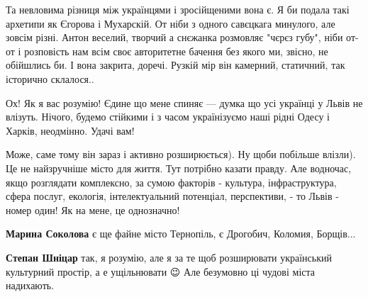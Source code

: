 \begin{itemize}
Та невловима різниця між українцями і зросійщеними вона є. Я би подала такі
архетипи як Єгорова і Мухарскій. От ніби з одного савєцкага минулого, але
зовсім різні. Антон веселий, творчий а снєжанка розмовляє "чєрєз губу", ніби
от-от і розповість нам всім своє авторитетне бачення без якого ми, звісно, не
обійшлись би. І вона закрита, доречі. Рузкій мір він камерний, статичний, так
історично склалося..


 
Ох! Як я вас розумію! Єдине що мене спиняє — думка що усі українці у Львів не
влізуть. Нічого, будемо стійкими і з часом українізуємо наші рідні Одесу і
Харків, неодмінно. Удачі вам!

\begin{itemize}
 

Може, саме тому він зараз і активно розширюється). Ну щоби побільше влізли). Це
не найзручніше місто для життя. Тут потрібно казати правду. Але водночас, якщо
розглядати комплексно, за сумою факторів - культура, інфраструктура, сфера
послуг, екологія, інтелектуальний потенціал, перспективи, - то Львів - номер
один! Як на мене, це однозначно!


 
\textbf{Марина Соколова} є ще файне місто Тернопіль, є Дрогобич, Коломия, Борщів...

 
\textbf{Степан Шніцар} так, я розумію, але я за те щоб розширювати український культурний простір, а е ущільнювати 😉 Але безумовно ці чудові міста надихають.


\end{itemize}
\end{itemize}
